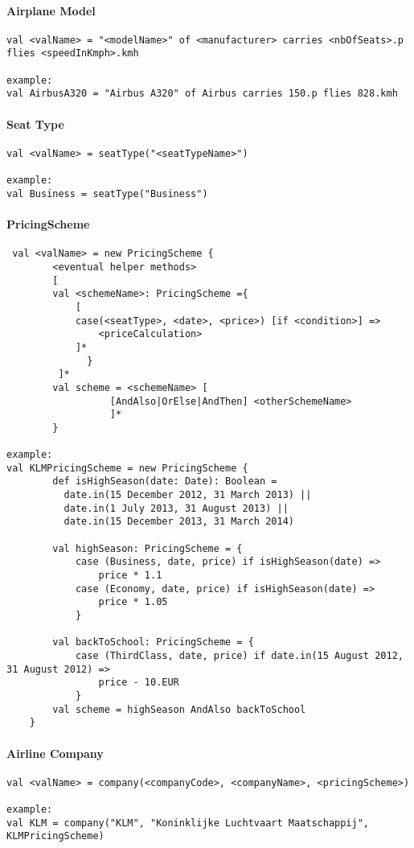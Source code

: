  \paragraph{Airplane Model}\hfill
\begin{lstlisting}
val <valName> = "<modelName>" of <manufacturer> carries <nbOfSeats>.p flies <speedInKmph>.kmh

example:
val AirbusA320 = "Airbus A320" of Airbus carries 150.p flies 828.kmh
\end{lstlisting}

 \paragraph{Seat Type}\hfill
\begin{lstlisting}
val <valName> = seatType("<seatTypeName>")

example:
val Business = seatType("Business")
\end{lstlisting}

\paragraph{PricingScheme}\hfill
\begin{lstlisting}
 val <valName> = new PricingScheme {
		<eventual helper methods>
		[
		val <schemeName>: PricingScheme ={
			[
			case(<seatType>, <date>, <price>) [if <condition>] =>
			    <priceCalculation>
			]*
		      }
		 ]*
		val scheme = <schemeName> [
			      [AndAlso|OrElse|AndThen] <otherSchemeName>
				  ]*
		}
	
example:
val KLMPricingScheme = new PricingScheme {
		def isHighSeason(date: Date): Boolean =
		  date.in(15 December 2012, 31 March 2013) ||
		  date.in(1 July 2013, 31 August 2013) ||
		  date.in(15 December 2013, 31 March 2014)

		val highSeason: PricingScheme = {
			case (Business, date, price) if isHighSeason(date) =>
			    price * 1.1
			case (Economy, date, price) if isHighSeason(date) =>
			    price * 1.05
			}
			    
		val backToSchool: PricingScheme = {
			case (ThirdClass, date, price) if date.in(15 August 2012, 31 August 2012) =>
			    price - 10.EUR
			}
		val scheme = highSeason AndAlso backToSchool
	}
\end{lstlisting}

\paragraph{Airline Company}\hfill
\begin{lstlisting}
val <valName> = company(<companyCode>, <companyName>, <pricingScheme>)

example:
val KLM = company("KLM", "Koninklijke Luchtvaart Maatschappij", KLMPricingScheme)
\end{lstlisting}
	    
